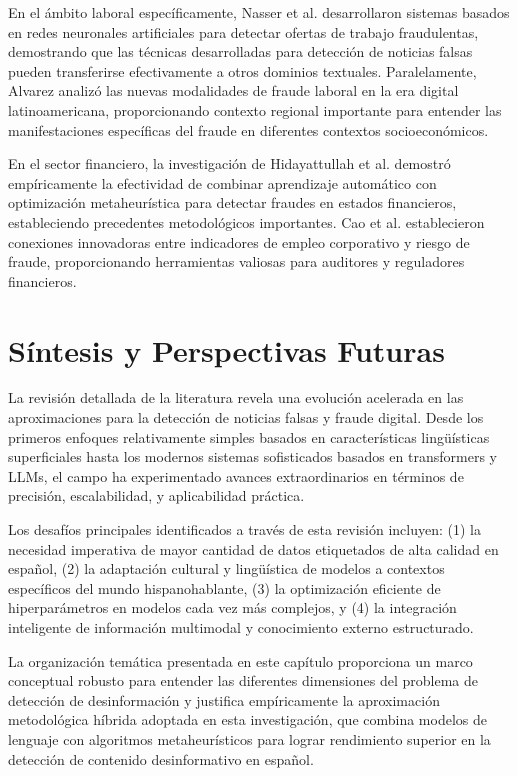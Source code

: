 En el ámbito laboral específicamente, Nasser et al. \cite{nasser2021online} desarrollaron sistemas basados en redes neuronales artificiales para detectar ofertas de trabajo fraudulentas, demostrando que las técnicas desarrolladas para detección de noticias falsas pueden transferirse efectivamente a otros dominios textuales. Paralelamente, Alvarez \cite{alvarez2021fraude} analizó las nuevas modalidades de fraude laboral en la era digital latinoamericana, proporcionando contexto regional importante para entender las manifestaciones específicas del fraude en diferentes contextos socioeconómicos.

En el sector financiero, la investigación de Hidayattullah et al. \cite{hidayattullah2020financial} demostró empíricamente la efectividad de combinar aprendizaje automático con optimización metaheurística para detectar fraudes en estados financieros, estableciendo precedentes metodológicos importantes. Cao et al. \cite{cao2020corporate} establecieron conexiones innovadoras entre indicadores de empleo corporativo y riesgo de fraude, proporcionando herramientas valiosas para auditores y reguladores financieros.

\section{Síntesis y Perspectivas Futuras}
\label{sec:sintesis_perspectivas}

La revisión detallada de la literatura revela una evolución acelerada en las aproximaciones para la detección de noticias falsas y fraude digital. Desde los primeros enfoques relativamente simples basados en características lingüísticas superficiales hasta los modernos sistemas sofisticados basados en transformers y LLMs, el campo ha experimentado avances extraordinarios en términos de precisión, escalabilidad, y aplicabilidad práctica.

Los desafíos principales identificados a través de esta revisión incluyen: (1) la necesidad imperativa de mayor cantidad de datos etiquetados de alta calidad en español, (2) la adaptación cultural y lingüística de modelos a contextos específicos del mundo hispanohablante, (3) la optimización eficiente de hiperparámetros en modelos cada vez más complejos, y (4) la integración inteligente de información multimodal y conocimiento externo estructurado.

La organización temática presentada en este capítulo proporciona un marco conceptual robusto para entender las diferentes dimensiones del problema de detección de desinformación y justifica empíricamente la aproximación metodológica híbrida adoptada en esta investigación, que combina modelos de lenguaje con algoritmos metaheurísticos para lograr rendimiento superior en la detección de contenido desinformativo en español.